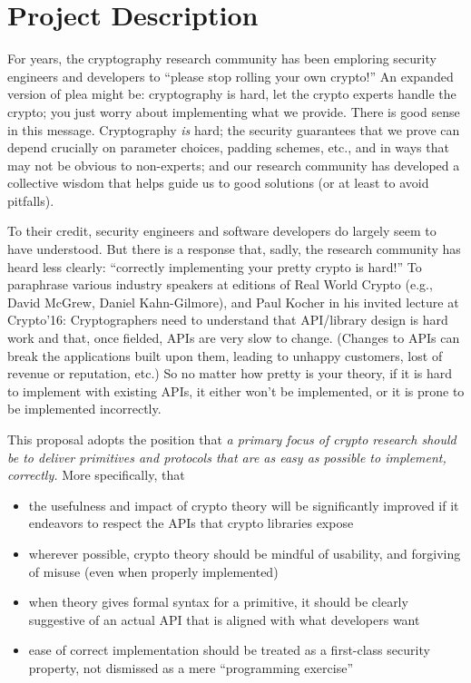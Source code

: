 \section{Project Description}
\label{sec:intro}

For years, the cryptography research community has been emploring security engineers and developers to ``please stop rolling your own crypto!''  An expanded version of plea might be: cryptography is hard, let the crypto experts handle the crypto; you just worry about implementing what we provide.  There is good sense in this message.  Cryptography \emph{is} hard; the security guarantees that we prove can depend crucially on parameter choices, padding schemes, etc., and in ways that may not be obvious to non-experts; and our research community has developed a collective wisdom that helps guide us to good solutions (or at least to avoid pitfalls).  

To their credit, security engineers and software developers do largely seem to have understood.  But there is a response that, sadly, the research community has heard less clearly: ``correctly implementing your pretty crypto is hard!''  To paraphrase various industry speakers at editions of Real World Crypto (e.g., David McGrew, Daniel Kahn-Gilmore), and Paul Kocher in his invited lecture at Crypto'16:
%
Cryptographers need to understand that API/library design is hard work and that, once fielded, APIs are very slow to change.  (Changes to APIs can break the applications built upon them, leading to unhappy customers, lost of revenue or reputation, etc.)  So no matter how pretty is your theory, if it is hard to implement with existing APIs, it either won't be implemented, or it is prone to be implemented incorrectly.    
%

This proposal adopts the position that \emph{a primary focus of crypto research should be to deliver primitives and protocols that are as easy as possible to implement, correctly.}  More specifically, that 
\begin{itemize}
\item the usefulness and impact of crypto theory will be significantly improved if it endeavors to respect the APIs that crypto libraries expose
\item wherever possible, crypto theory should be mindful of usability, and forgiving of misuse (even when properly implemented)
\item when theory gives formal syntax for a primitive, it should be clearly suggestive of an actual API that is aligned with what developers want 
\item ease of correct implementation should be treated as a first-class security property, not dismissed as a mere ``programming exercise''
\end{itemize}

